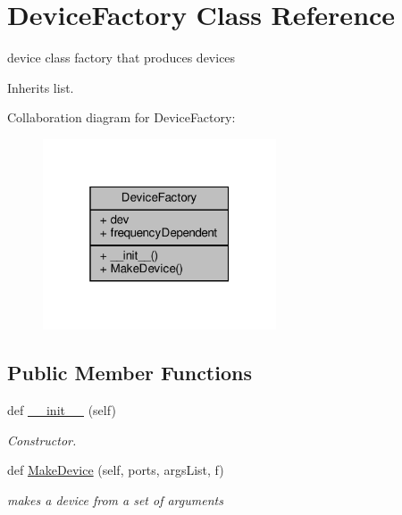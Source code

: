 \hypertarget{classSignalIntegrity_1_1Parsers_1_1Devices_1_1DeviceParser_1_1DeviceFactory}{}\section{Device\+Factory Class Reference}
\label{classSignalIntegrity_1_1Parsers_1_1Devices_1_1DeviceParser_1_1DeviceFactory}


device class factory that produces devices  




Inherits list.



Collaboration diagram for Device\+Factory\+:
\nopagebreak
\begin{figure}[H]
\begin{center}
\leavevmode
\includegraphics[width=196pt]{classSignalIntegrity_1_1Parsers_1_1Devices_1_1DeviceParser_1_1DeviceFactory__coll__graph}
\end{center}
\end{figure}
\subsection*{Public Member Functions}
\begin{DoxyCompactItemize}
\item 
def \hyperlink{classSignalIntegrity_1_1Parsers_1_1Devices_1_1DeviceParser_1_1DeviceFactory_ae64f0875afe3067b97ba370b354b9213}{\+\_\+\+\_\+init\+\_\+\+\_\+} (self)
\begin{DoxyCompactList}\small\item\em Constructor. \end{DoxyCompactList}\item 
def \hyperlink{classSignalIntegrity_1_1Parsers_1_1Devices_1_1DeviceParser_1_1DeviceFactory_a84bd6828768b3a1677c71d39f3cb91dd}{Make\+Device} (self, ports, args\+List, f)
\begin{DoxyCompactList}\small\item\em makes a device from a set of arguments \end{DoxyCompactList}\end{DoxyCompactItemize}
